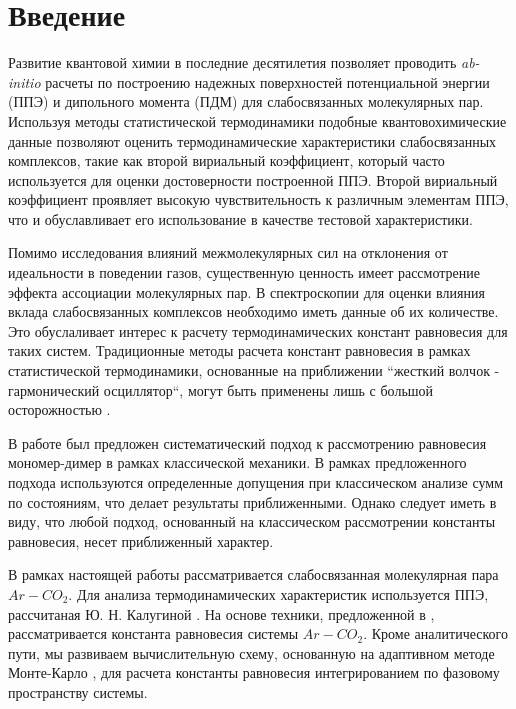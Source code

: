 \section{Введение}
Развитие квантовой химии в последние десятилетия позволяет проводить \textit{ab-initio} расчеты по построению надежных поверхностей потенциальной энергии (ППЭ) и дипольного момента (ПДМ) для слабосвязанных молекулярных пар. Используя методы статистической термодинамики подобные квантовохимические данные позволяют оценить термодинамические характеристики слабосвязанных комплексов, такие как второй вириальный коэффициент, который часто используется для оценки достоверности построенной ППЭ. Второй вириальный коэффициент проявляет высокую чувствительность к различным элементам ППЭ, что и обуславливает его использование в качестве тестовой характеристики. \par
 Помимо исследования влияний межмолекулярных сил на отклонения от идеальности в поведении газов, существенную ценность имеет рассмотрение эффекта ассоциации молекулярных пар. В спектроскопии для оценки влияния вклада слабосвязанных комплексов необходимо иметь данные об их количестве. Это обуслаливает интерес к расчету термодинамических констант равновесия для таких систем. Традиционные методы расчета констант равновесия в рамках статистической термодинамики, основанные на приближении ``жесткий волчок - гармонический осциллятор``, могут быть применены лишь с большой осторожностью \cite{camyvigasin}. \par
В работе \cite{vigasin2015} был предложен систематический подход к рассмотрению равновесия мономер-димер в рамках классической механики. В рамках предложенного подхода используются определенные допущения при классическом анализе сумм по состояниям, что делает результаты приближенными. Однако следует иметь в виду, что любой подход, основанный на классическом рассмотрении константы равновесия, несет приближенный характер. \par
В рамках настоящей работы рассматривается слабосвязанная молекулярная пара $Ar-CO_2$. Для анализа термодинамических характеристик используется ППЭ, рассчитаная Ю. Н. Калугиной \cite{kalugina2017}. На основе техники, предложенной в \cite{vigasin2015}, рассматривается константа равновесия системы $Ar-CO_2$. Кроме аналитического пути, мы развиваем вычислительную схему, основанную на адаптивном методе Монте-Карло \cite{lepage1978, vegas}, для расчета константы равновесия интегрированием по фазовому пространству системы. 
